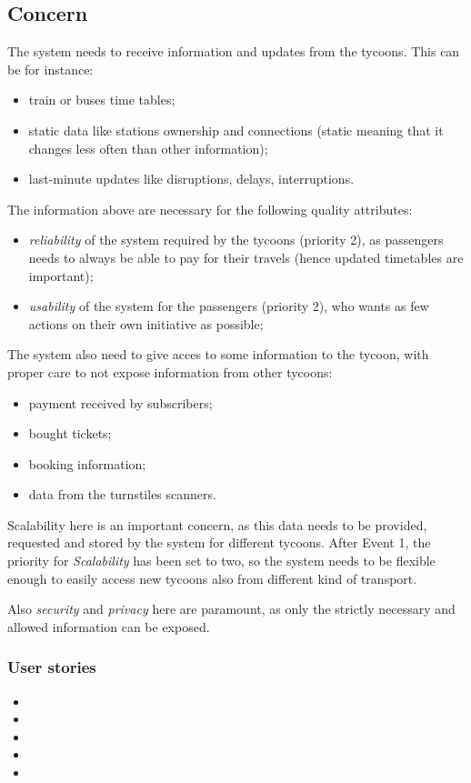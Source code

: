 \subsection*{Concern}
The system needs to receive information and updates from the tycoons. 
This can be for instance:
\begin{itemize}
    \item train or buses time tables;
    \item static data like stations ownership and connections (static meaning that it changes less often than other information);
    \item last-minute updates like disruptions, delays, interruptions.
\end{itemize}
The information above are necessary for the following quality attributes:
\begin{itemize}
    \item \textit{reliability} of the system required by the tycoons (priority 2), as passengers needs to always be able to pay for their travels (hence updated timetables are important);
    \item \textit{usability} of the system for the passengers (priority 2), who wants as few actions on their own initiative as possible;
\end{itemize}

The system also need to give acces to some information to the tycoon, with proper care to not expose information from other tycoons:
\begin{itemize}
    \item payment received by subscribers;
    \item bought tickets;
    \item booking information;
    \item data from the turnstiles scanners. 
\end{itemize}

Scalability here is an important concern, as this data needs to be provided, requested and stored by the system for different tycoons.
After Event 1, the priority for \textit{Scalability} has been set to two, so the system needs to be flexible enough to easily access new tycoons also from different kind of transport.

Also \textit{security} and \textit{privacy} here are paramount, as only the strictly necessary and allowed information can be exposed.

\subsubsection*{User stories}
\begin{itemize}
    \item \userStoryTwentySix
    \item \userStoryThirtyFive
    \item \userStoryThirtySix
    \item \userStoryThirtySeven
    \item \userStoryThirtyEight
\end{itemize}

